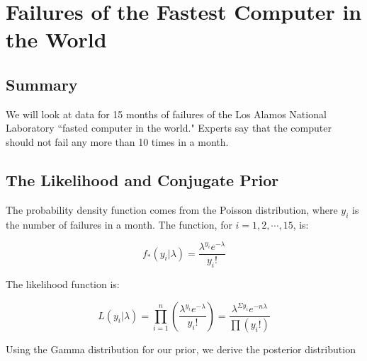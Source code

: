 \documentclass[12pt]{article}
\begin{document}
\newpage

\section{Failures of the Fastest Computer in the World}

\subsection{Summary}

\noindent We will look at data for 15 months of failures of the Los Alamos National Laboratory ``fasted computer in the world."  Experts say that the computer should not fail any more than 10 times in a month.

\subsection{The Likelihood and Conjugate Prior}

The probability density function comes from the Poisson distribution, where $y_i$ is the number of failures in a month.  The function, for $i=1,2,\cdots,15$, is:

\[f_*(y_i|\lambda)=\frac{\lambda^{y_i}e^{-\lambda}}{y_i!} \]

\noindent The likelihood function is:

\[L(y_i|\lambda) = \prod_{i=1}^n\left(\frac{\lambda^{y_i}e^{-\lambda}}{y_i!}\right) = \frac{\lambda^{\Sigma y_i}e^{-n\lambda}}{\prod (y_i!)}\]



\noindent Using the Gamma distribution for our prior, we derive the posterior distribution \\ [-1.cm]
\end{document}
